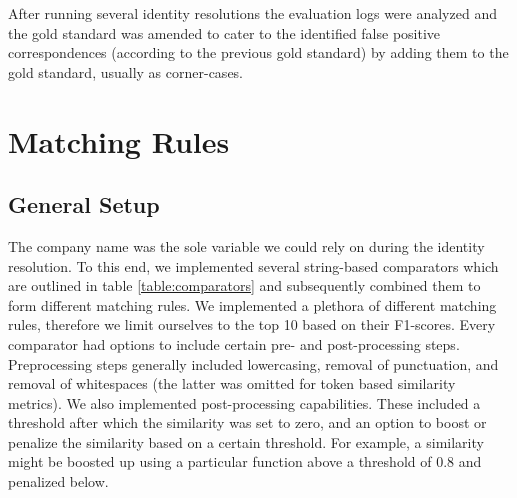 \documentclass[11pt,titlepage,oneside,openany]{book}
\begin{document}

After running several identity resolutions the evaluation logs were analyzed and the gold standard was amended to cater to the identified false positive correspondences (according to the previous gold standard) by adding them to the gold standard, usually as corner-cases. 

\section{Matching Rules}
\label{sec:matching-rules}

\subsection{General Setup}
The company name was the sole variable we could rely on during the identity resolution. To this end, we implemented several string-based comparators which are outlined in table \ref{table:comparators} and subsequently combined them to form different matching rules. We implemented a plethora of different matching rules, therefore we limit ourselves to the top 10 based on their F1-scores.
Every comparator had options to include certain pre- and post-processing steps. Preprocessing steps generally included lowercasing, removal of punctuation, and removal of whitespaces (the latter was omitted for token based similarity metrics). We also implemented post-processing capabilities. These included a threshold after which the similarity was set to zero, and an option to boost or penalize the similarity based on a certain threshold. For example, a similarity might be boosted up using a particular function above a threshold of 0.8 and penalized below. %
\end{document}
